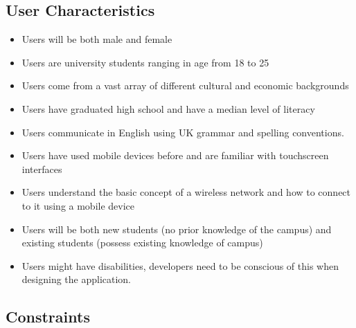 \documentclass[a4paper,12pt]{article}
\begin{document}
\subsection{User Characteristics}
\begin{itemize}
\small
\item Users will be both male and female
\item Users are university students ranging in age from 18 to 25
\item Users come from a vast array of different cultural and economic backgrounds
\item Users have graduated high school and have a median level of literacy
\item Users communicate in English using UK grammar and spelling conventions.
\item Users have used mobile devices before and are familiar with touchscreen interfaces
\item Users understand the basic concept of a wireless network and how to connect to it using a mobile device
\item Users will be both new students (no prior knowledge of the campus) and existing students (possess existing knowledge of campus)
\item Users might have disabilities, developers need to be conscious of this when designing the application. 
\end{itemize}
\subsection{Constraints}
\end{document}
